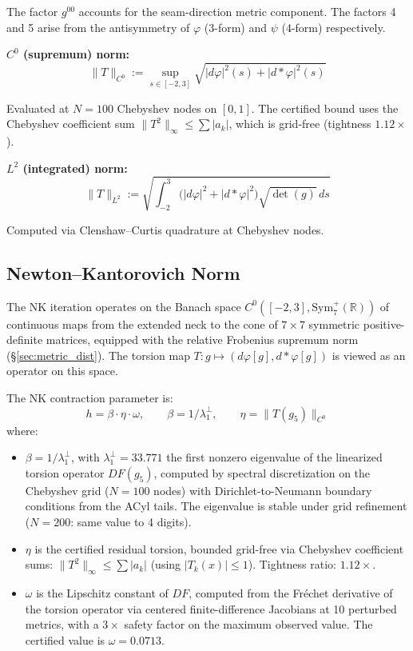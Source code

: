 \documentclass[11pt,a4paper]{article}
\newcommand{\Sym}{\mathrm{Sym}}
\newcommand{\norm}[1]{\|#1\|}
\theoremstyle{remark}
\begin{document}
The factor $g^{00}$ accounts for the seam-direction metric component. The factors 4 and 5
arise from the antisymmetry of $\varphi$ (3-form) and $\psi$ (4-form) respectively.

\textbf{$C^0$ (supremum) norm:}
\begin{equation}\label{eq:torsion_c0}
\norm{T}_{C^0} := \sup_{s \in [-2,3]} \sqrt{|d\varphi|^2(s) + |d{*}\varphi|^2(s)}
\end{equation}

Evaluated at $N = 100$ Chebyshev nodes on $[0,1]$. The certified bound uses the Chebyshev
coefficient sum $\norm{T^2}_\infty \leq \sum|a_k|$, which is grid-free (tightness $1.12\times$).

\textbf{$L^2$ (integrated) norm:}
\begin{equation}\label{eq:torsion_l2}
\norm{T}_{L^2} := \sqrt{\int_{-2}^{3} \bigl(|d\varphi|^2 + |d{*}\varphi|^2\bigr) \sqrt{\det(g)}\, ds}
\end{equation}

Computed via Clenshaw--Curtis quadrature at Chebyshev nodes.

\subsection{Newton--Kantorovich Norm}\label{sec:nk_norm}

The NK iteration operates on the Banach space $C^0([-2, 3], \Sym^+_7(\mathbb{R}))$ of continuous
maps from the extended neck to the cone of $7 \times 7$ symmetric positive-definite matrices,
equipped with the relative Frobenius supremum norm (\S\ref{sec:metric_dist}). The torsion map
$T : g \mapsto (d\varphi[g], d{*}\varphi[g])$ is viewed as an operator on this space.

The NK contraction parameter is:
\begin{equation}\label{eq:nk_h}
h = \beta \cdot \eta \cdot \omega, \qquad \beta = 1/\lambda_1^\perp, \qquad \eta = \norm{T(g_5)}_{C^0}
\end{equation}
where:
\begin{itemize}
    \item $\beta = 1/\lambda_1^\perp$, with $\lambda_1^\perp = 33.771$ the first nonzero eigenvalue of the linearized
          torsion operator $DF(g_5)$, computed by spectral discretization on the Chebyshev grid
          ($N = 100$ nodes) with Dirichlet-to-Neumann boundary conditions from the ACyl tails.
          The eigenvalue is stable under grid refinement ($N = 200$: same value to 4 digits).
    \item $\eta$ is the certified residual torsion, bounded grid-free via Chebyshev coefficient
          sums: $\norm{T^2}_\infty \leq \sum|a_k|$ (using $|T_k(x)| \leq 1$). Tightness ratio: $1.12\times$.
    \item $\omega$ is the Lipschitz constant of $DF$, computed from the Fr\'echet derivative of the
          torsion operator via centered finite-difference Jacobians at 10 perturbed metrics,
          with a $3\times$ safety factor on the maximum observed value. The certified value is
          $\omega = 0.0713$.
\end{itemize}
\end{document}
